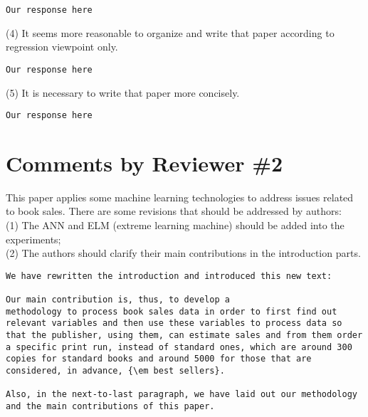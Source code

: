 \documentclass[preprint]{elsarticle}
\begin{document}
\begin{verbatim}
Our response here
\end{verbatim}

\noindent (4) It seems more reasonable to organize and write that paper according to regression viewpoint only.\\

\begin{verbatim}
Our response here
\end{verbatim}

\noindent (5) It is necessary to write that paper more concisely.\\

\begin{verbatim}
Our response here
\end{verbatim}





\section{Comments by Reviewer \#2}

\noindent This paper applies some machine learning technologies to address issues related to book sales. There are some revisions that should be addressed by authors:\\

\noindent (1) The ANN and ELM (extreme learning machine) should be added into the experiments;\\

\noindent (2) The authors should clarify their main contributions in the introduction parts.\\

\begin{verbatim}
We have rewritten the introduction and introduced this new text:

Our main contribution is, thus, to develop a
methodology to process book sales data in order to first find out
relevant variables and then use these variables to process data so
that the publisher, using them, can estimate sales and from them order
a specific print run, instead of standard ones, which are around 300
copies for standard books and around 5000 for those that are
considered, in advance, {\em best sellers}.

Also, in the next-to-last paragraph, we have laid out our methodology and the main contributions of this paper.

\end{verbatim}
\end{document}
